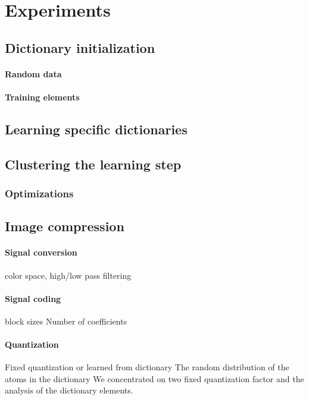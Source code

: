 \section{Experiments}

\subsection{Dictionary initialization}
\paragraph{Random data} 
\paragraph{Training elements}


\subsection{Learning specific dictionaries}


\subsection{Clustering the learning step}
\subsubsection*{Optimizations}


\subsection{Image compression}
\paragraph{Signal conversion}
color space, high/low pass filtering

\paragraph{Signal coding}
block sizes
Number of coefficients


\paragraph{Quantization}
Fixed quantization or learned from dictionary
The random distribution of the atoms in the dictionary 
We concentrated on two fixed quantization factor and the analysis of the dictionary elements.

